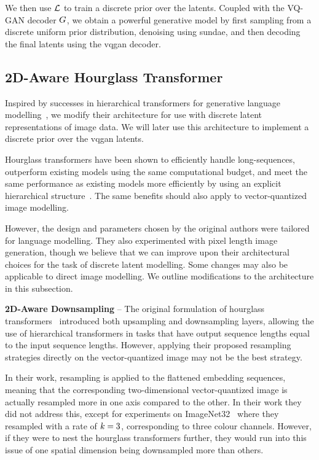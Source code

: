 We then use $\mathcal{L}$ to train a discrete prior over the latents. Coupled
with the VQ-GAN decoder $G$, we obtain a powerful generative model
by first sampling from a discrete uniform prior distribution, denoising using
\gls{sundae}, and then decoding the final latents using the \gls{vqgan} decoder.

\subsection{2D-Aware Hourglass Transformer}
Inspired by successes in hierarchical transformers for generative language
modelling~\cite{nawrot2021hierarchical}, we modify their architecture for use
with discrete latent representations of image data. We will later use this
architecture to implement a discrete prior over the \gls{vqgan} latents. 

Hourglass transformers have been shown to efficiently handle long-sequences,
outperform existing models using the same computational budget, and meet the
same performance as existing models more efficiently by using an explicit
hierarchical structure~\cite{nawrot2021hierarchical}. The same benefits should
also apply to vector-quantized image modelling. 

However, the design and parameters chosen by the original authors were tailored
for language modelling. They also experimented with pixel length image
generation, though we believe that we can improve upon their architectural
choices for the task of discrete latent modelling. Some changes may also be
applicable to direct image modelling. We outline modifications to the
architecture in this subsection.

\textbf{2D-Aware Downsampling} -- The original formulation of hourglass
transformers~\cite{nawrot2021hierarchical} introduced both upsampling and
downsampling layers, allowing the use of hierarchical transformers in tasks that
have output sequence lengths equal to the input sequence lengths. However,
applying their proposed resampling strategies directly on the vector-quantized
image may not be the best strategy. 

In their work, resampling is applied to the flattened embedding sequences,
meaning that the corresponding two-dimensional vector-quantized image is
actually resampled more in one axis compared to the other. In their work they
did not address this, except for experiments on
ImageNet32~\cite{russakovsky2015imagenet} where they resampled with a rate of
$k=3$, corresponding to three colour channels. However, if they
were to nest the hourglass transformers further, they would run into this issue
of one spatial dimension being downsampled more than others.

